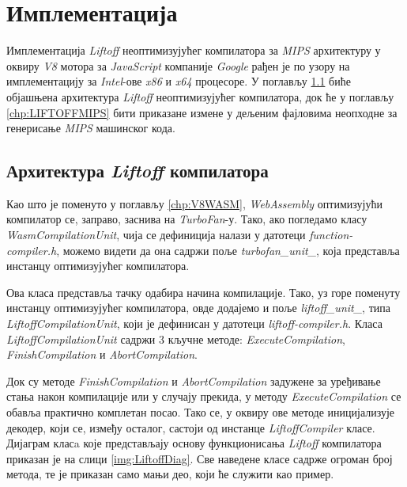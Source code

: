 \documentclass[12pt,oneside]{memoir}
\begin{document}
\chapter{Имплементација}

Имплементација \textit{Liftoff} неоптимизујућег компилатора за \textit{MIPS} архитектуру у оквиру \textit{V8} мотора за \textit{JavaScript} компаније \textit{Google}
рађен је по узору на имплементацију за \textit{Intel}-ове \textit{x86} и \textit{x64} процесоре. У поглављу \ref{chp:LIFTOFFARCH} биће објашњена архитектура \textit{Liftoff} неоптимизујућег
компилатора, док ће у поглављу \ref{chp:LIFTOFFMIPS} бити приказане измене у дељеним фајловима неопходне за генерисање \textit{MIPS} машинског кода.

\section{Архитектура \textit{Liftoff} компилатора} \label{chp:LIFTOFFARCH}


Као што је поменуто у поглављу \ref{chp:V8WASM}, \textit{WebAssembly} оптимизујући компилатор се, заправо, заснива на \textit{TurboFan}-у. Тако, ако погледамо класу
\textit{WasmCompilationUnit}, чија се дефиниција налази у датотеци \textit{function-compiler.h}, можемо видети да она садржи поље \textit{ turbofan\_unit\_}, која представља инстанцу
оптимизујућег компилатора.

Ова класа представља тачку одабира начина компилације. Тако, уз горе поменуту инстанцу оптимизујућег компилатора, овде додајемо и поље \textit{liftoff\_unit\_}, типа \textit{LiftoffCompilationUnit},
који је дефинисан у датотеци \textit{liftoff-compiler.h}. Класа \textit{LiftoffCompilationUnit} садржи 3 кључне методе: \textit{ExecuteCompilation}, \textit{FinishCompilation} и \textit{AbortCompilation}.

Док су методе \textit{FinishCompilation} и \textit{AbortCompilation} задужене за уређивање стања након компилације или у случају прекида, у методу \textit{ExecuteCompilation}
се обавља практично комплетан посао. Тако се, у оквиру ове методе иницијализује декодер, који се, између осталог, састоји од инстанце \textit{LiftoffCompiler} класе. Дијаграм класa које представљају основу
функционисања \textit{Liftoff} компилатора приказан је на слици \ref{img:LiftoffDiag}. Све наведене класе садрже огроман број метода, те је приказан само мањи део, који ће служити као пример.
\end{document}

